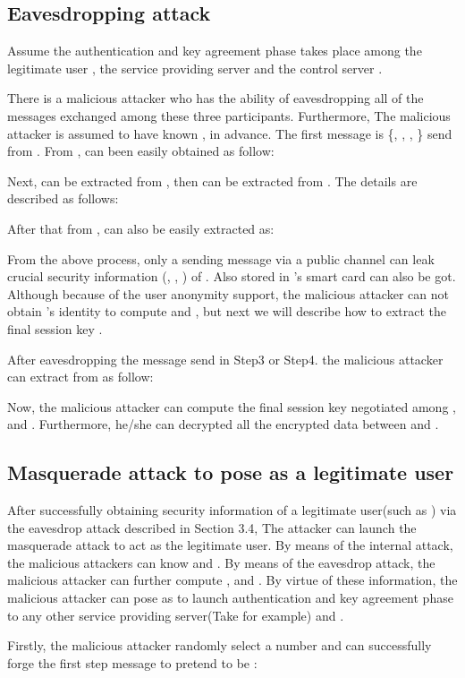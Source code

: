 \documentclass[preprint,12pt]{elsarticle}
\begin{document}
\subsection{Eavesdropping attack}
Assume the authentication and key agreement phase takes place among the legitimate user , the service providing server  and the control server .

There is a malicious attacker who has the ability of eavesdropping all of the messages exchanged among these three participants. Furthermore, The malicious attacker is assumed to have known ,  in advance. The first message is  \{, , , \} send from . From ,  can been easily obtained as follow:

Next,  can be extracted from , then  can be extracted from . The details are described as follows:

After that from ,  can also be easily extracted as:


From the above process, only a sending message via a public channel can leak crucial security information (, , ) of . Also  stored in 's smart card can also be got. Although because of the user anonymity support, the malicious attacker can not obtain 's identity  to compute  and , but next we will describe how to extract the final session key .

After eavesdropping the message send in Step3 or Step4. the malicious attacker can extract  from  as follow:


Now, the malicious attacker can compute the final session key negotiated among ,  and . Furthermore, he/she can decrypted all the encrypted data between  and .

\subsection{Masquerade attack to pose as a legitimate user}
After successfully obtaining security information of a legitimate user(such as ) via the eavesdrop attack described in Section 3.4, The attacker can launch the masquerade attack to act as the legitimate user. By means of the internal attack, the malicious attackers can know  and . By means of the eavesdrop attack, the malicious attacker can further compute ,  and . By virtue of these information, the malicious attacker can pose as  to launch authentication and key agreement phase to any other service providing server(Take  for example) and .

Firstly, the malicious attacker randomly select a number  and can successfully forge the first step message to pretend to be :
\end{document}
